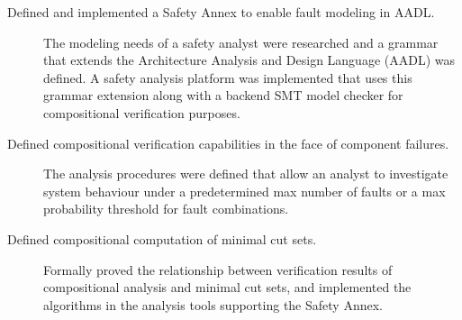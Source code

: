 \begin{description}
\item[Defined and implemented a Safety Annex to enable fault modeling in AADL.] The modeling needs of a safety analyst were researched and a grammar that extends the Architecture Analysis and Design Language (AADL) was defined. A safety analysis platform was implemented that uses this grammar extension along with a backend SMT model checker for compositional verification purposes.
\item[Defined compositional verification capabilities in the face of component failures.] The analysis procedures were defined that allow an analyst to investigate system behaviour under a predetermined max number of faults or a max probability threshold for fault combinations.%


\item[Defined compositional computation of minimal cut sets.] Formally proved the relationship between verification results of compositional analysis and minimal cut sets, and implemented the algorithms in the analysis tools supporting the Safety Annex.


\end{description}
